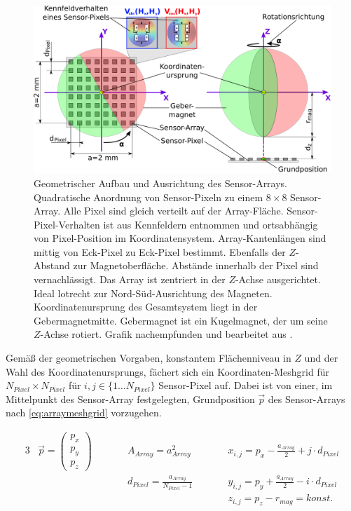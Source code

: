 \begin{figure}[tph]
	\centering
	\includegraphics[width=.9\linewidth]{chapters/images/2-Grundlagen/Sensor-Array-Prinzip}
	\caption[Geometrischer Aufbau und Ausrichtung des Sensor-Arrays]{Geometrischer Aufbau und Ausrichtung des Sensor-Arrays. Quadratische Anordnung von Sensor-Pixeln zu einem $8 \times 8$ Sensor-Array. Alle Pixel sind gleich verteilt auf der Array-Fläche. Sensor-Pixel-Verhalten ist aus Kennfeldern entnommen und ortsabhängig von Pixel-Position im Koordinatensystem. Array-Kantenlängen sind mittig von Eck-Pixel zu Eck-Pixel bestimmt. Ebenfalls der $Z$-Abstand zur Magnetoberfläche. Abstände innerhalb der Pixel sind vernachlässigt. Das Array ist zentriert in der $Z$-Achse ausgerichtet. Ideal lotrecht zur Nord-Süd-Ausrichtung des Magneten. Koordinatenursprung des Gesamtsystem liegt in der Gebermagnetmitte. Gebermagnet ist ein Kugelmagnet, der um seine $Z$-Achse rotiert. Grafik nachempfunden und bearbeitet aus \cite{Schuethe2020b}.}
	\label{fig:sensor-array-prinzip}
\end{figure}


Gemäß der geometrischen Vorgaben, konstantem Flächenniveau in $Z$ und der Wahl des Koordinatenursprungs, fächert sich ein Koordinaten-Meshgrid für $N_{Pixel} \times N_{Pixel}$ für $i,j \in \{1 \ldots N_{Pixel} \}$ Sensor-Pixel auf. Dabei ist von einer, im Mittelpunkt des Sensor-Array festgelegten, Grundposition $\vec{p}$ des Sensor-Arrays nach \autoref{eq:arraymeshgrid} vorzugehen. 


\begin{alignat}{3}\label{eq:arraymeshgrid}
	&\vec{p} = \begin{pmatrix}p_x \\ p_y \\ p_z\end{pmatrix} \qquad && A_{Array} = a_{Array}^2 \qquad 					  && x_{i,j} = p_x - \frac{a_{Array}}{2} + j \cdot d_{Pixel} \nonumber\\
	& 																&& d_{Pixel} = \frac{a_{Array}}{N_{Pixel} - 1} \qquad && y_{i,j} = p_y + \frac{a_{Array}}{2} - i \cdot d_{Pixel} \\
	& 																&& 													  && z_{i,j} = p_z - r_{mag} = konst.\nonumber
\end{alignat}


